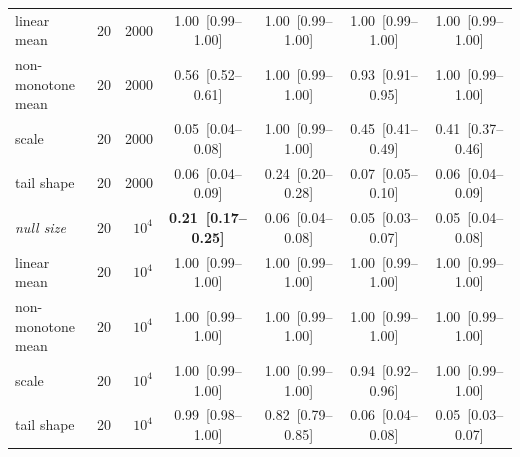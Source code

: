 \begin{table}[t]
\begin{tabular}{llrcccc}
linear mean & 20 & 2000 & 1.00~[0.99--1.00] & 1.00~[0.99--1.00] & 1.00~[0.99--1.00] & 1.00~[0.99--1.00] \\
non-monotone mean & 20 & 2000 & 0.56~[0.52--0.61] & 1.00~[0.99--1.00] & 0.93~[0.91--0.95] & 1.00~[0.99--1.00] \\
scale & 20 & 2000 & 0.05~[0.04--0.08] & 1.00~[0.99--1.00] & 0.45~[0.41--0.49] & 0.41~[0.37--0.46] \\
tail shape & 20 & 2000 & 0.06~[0.04--0.09] & 0.24~[0.20--0.28] & 0.07~[0.05--0.10] & 0.06~[0.04--0.09] \\
\midrule
\emph{null size} & 20 & $10^4$ & \textbf{0.21~[0.17--0.25]} & 0.06~[0.04--0.08] & 0.05~[0.03--0.07] & 0.05~[0.04--0.08] \\
linear mean & 20 & $10^4$ & 1.00~[0.99--1.00] & 1.00~[0.99--1.00] & 1.00~[0.99--1.00] & 1.00~[0.99--1.00] \\
non-monotone mean & 20 & $10^4$ & 1.00~[0.99--1.00] & 1.00~[0.99--1.00] & 1.00~[0.99--1.00] & 1.00~[0.99--1.00] \\
scale & 20 & $10^4$ & 1.00~[0.99--1.00] & 1.00~[0.99--1.00] & 0.94~[0.92--0.96] & 1.00~[0.99--1.00] \\
tail shape & 20 & $10^4$ & 0.99~[0.98--1.00] & 0.82~[0.79--0.85] & 0.06~[0.04--0.08] & 0.05~[0.03--0.07] \\
\bottomrule
\end{tabular}
\end{table}
